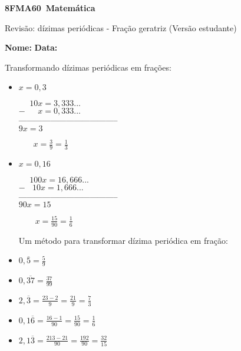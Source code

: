 \documentclass[a4paper,14pt]{article}
\begin{document}
	
	\noindent\textbf{8FMA60~Matemática} 
	
	\begin{center}Revisão: dízimas periódicas - Fração geratriz (Versão estudante)
	\end{center}
	
	\noindent\textbf{Nome:} \underline{\hspace{10cm}}
	\noindent\textbf{Data:} \underline{\hspace{4cm}}
	
	
	
    \begin{multicols}{2}
    	Transformando dízimas periódicas em frações: \\
    	\begin{itemize}
    		\item $x = 0,3$
    		\begin{center}
    			$~~~~~~10x = 3,333...$\\
    			$-~~~~~~~x = 0,333...$\\
    			\textsubscript{\textbf{--------------------------------------}}\\
    			$9x = 3$
    		\end{center}
    	    \begin{center}
    	    	$~~~~~~~~x = \frac{3}{9} = \frac{1}{3}$
    	    \end{center}
    		\item $x = 0,16$ \\
    		\begin{center}
    			$~~~~~~100x = 16,666...$\\
    			$-~~~~10x = 1,666...$\\
    			\textsubscript{\textbf{--------------------------------------}}\\
    			$90x = 15$ \\
    		\end{center}
    	    \begin{center}
    	    	$~~~~~~~~~x = \frac{15}{90} = \frac{1}{6}$
    	    \end{center}
        Um método para transformar dízima periódica em fração:
        \item $0,\overline{5} = \frac{5}{9}$
        \item $0,\overline{37} = \frac{37}{99}$
        \item $2,\overline{3} = \frac{23 - 2}{9} = \frac{21}{9} = \frac{7}{3}$
        \item $0,1\overline{6} = \frac{16 - 1}{90} = \frac{15}{90} = \frac{1}{6}$
        \item $2,1\overline{3} = \frac{213 - 21}{90} = \frac{192}{90} = \frac{32}{15}$
    	\end{itemize}
    	

\end{multicols}
\end{document}
